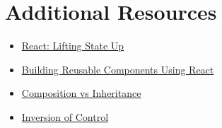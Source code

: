 \section{Additional Resources}

\begin{itemize}[leftmargin=*]
    \item \href{https://reactjs.org/docs/lifting-state-up.html}{React: Lifting State Up}
    \item \href{https://buttercms.com/blog/building-reusable-components-using-react}{Building Reusable Components Using React}
    \item \href{https://programmingwithmosh.com/react/react-composition-vs-inheritance/}{Composition vs Inheritance}
    \item \href{https://kentcdodds.com/blog/inversion-of-control}{Inversion of Control}
\end{itemize}
